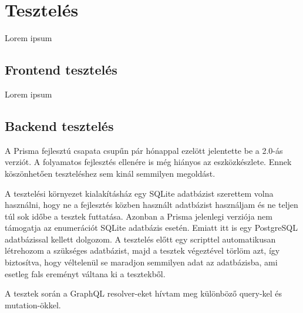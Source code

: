 \chapter{Tesztelés}

Lorem ipsum

\section{Frontend tesztelés}

Lorem ipsum

\section{Backend tesztelés}

A Prisma fejlesztú csapata csupűn pár hónappal ezelött jelentette be a 2.0-ás verziót.
A folyamatos fejlesztés ellenére is még hiányos az eszközkészlete.
Ennek köszönhetően teszteléshez sem kinál semmilyen megoldást.

A tesztelési környezet kialakításház egy SQLite adatbázist szerettem volna használni, hogy ne a fejlesztés közben használt adatbázist használjam és ne teljen túl sok időbe a tesztek futtatása.
Azonban a Prisma jelenlegi verziója nem támogatja az enumerációt SQLite adatbázis esetén.
Emiatt itt is egy PostgreSQL adatbázissal kellett dolgozom.
A tesztelés előtt egy scripttel automatikusan létrehozom a szükséges adatbázist, majd a tesztek végeztével törlöm azt, így biztosítva, hogy véltelenül se maradjon semmilyen adat az adatbázisba, ami esetleg fals ereményt váltana ki a tesztekből.

A tesztek során a GraphQL resolver-eket hívtam meg különböző query-kel és mutation-ökkel.
